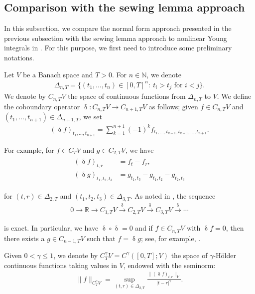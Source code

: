 \documentclass[letterpaper, 11pt,  reqno]{amsart}
\newcommand{\1}{\hspace{0.5mm}\text{I}\hspace{0.5mm}}
\newcommand{\noi}{\noindent}
\newcommand{\R}{\mathbb{R}}
\newcommand{\updl}{\updelta}
\newcommand{\Dl}{\Delta}
\newcommand{\g}{\gamma}
\newcommand{\N}{\mathbb{N}}
\newcommand{\too}{\longrightarrow}
\numberwithin{equation}{section}
\numberwithin{theorem}{section}
\begin{document}
\subsection{Comparison with 
the sewing lemma approach}
\label{SUBSEC:comp}


In this subsection, we
compare  the normal form approach 
presented in the previous subsection  with the sewing lemma approach 
to nonlinear Young integrals in \cite{CGLLO1}.
For this purpose, we first need to introduce some preliminary notations.


Let $V$ be a Banach space and $T>0$.
For $n\in\N$, we denote 
\begin{align*}
\Delta_{n, T} = 
\big\{ (t_1, \ldots, t_n) \in [0,T]^n: \ t_i > t_j 
\text{ for } i < j\big\}.
\end{align*}
We denote by $C_{n,T}V$ 
the space of continuous functions 
from $\Delta_{n,T}$ to $V$. 
We define the coboundary operator 
$\updl: C_{n,T} V  \to C_{n+1,T} V$ 
as follows; 
given  $f\in C_{n,T} V$ 
and $(t_1,\ldots, t_{n+1}) \in \Dl_{{n+1},T}$, 
we set
\begin{align*}
(\updl f)_{t_1,\ldots , t_{n+1}} = 
\sum_{k=1}^{n+1} (-1)^{k} f_{t_1, \ldots, t_{k-1}, t_{k+1}, \ldots, t_{n+1}}.
\end{align*}



\noi
For example, for $f\in C_T V$
and 
$g\in C_{2,T} V$, 
we have 
\begin{align}
\begin{split}
(\updl f )_{t,r} &= f_t - f_r, \\
(\updl g)_{t_1,t_2,t_3} &= 
g_{t_1,t_3} - g_{t_1,t_2} - g_{t_2,t_3}
\end{split}
\label{dl1}
\end{align}



\noi
for $(t,r)\in\Dl_{2,T}$
and $(t_1,t_2,t_3) \in \Dl_{3,T}$.
As noted in \cite{GT10}, 
the sequence 
\begin{align*}
0 \too \R \too C_{1, T}V \stackrel{\updl}{\too} C_{2, T}V
\stackrel{\updl}{\too} C_{3, T}V
\stackrel{\updl}{\too} \cdots
\end{align*}

\noi
is exact. 
In particular, we have 
 $\updl\circ\updl =0$ and 
if $f \in C_{n,T} V$ with $\updl f =0$, 
then there exists a $g\in C_{n-1,T}V$ 
such that $f= \updl g$; 
see, for example,  \cite[Lemma 2.1]{GT10}. 

Given $0 < \g \le 1$, we denote by $C^\g_T V = C^\g([0, T]; V)$ the space of $\g$-H\"older continuous functions taking values in $V$, endowed  with the seminorm:
\begin{align*}
\|f\|_{C^\g_T V} = \sup_{(t,r)\in \Dl_{2,T}} 
\frac{\|(\updl f)_{t,r}\|_V}{|t-r|^\g}.
\end{align*}
\end{document}
